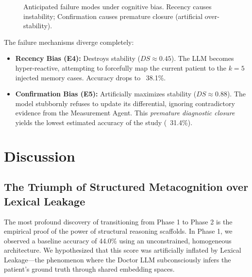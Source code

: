 \documentclass[12pt, a4paper, twoside]{report}
\begin{document}
\begin{figure}[htbp]
\centering
{}
\caption{Anticipated failure modes under cognitive bias. Recency causes instability; Confirmation causes premature closure (artificial over-stability).}
\label{fig:bias_impact_phase2}
\end{figure}

The failure mechanisms diverge completely:
\begin{itemize}
    \item \textbf{Recency Bias (E4):} Destroys stability ($DS \approx 0.45$). The LLM becomes hyper-reactive, attempting to forcefully map the current patient to the $k=5$ injected memory cases. Accuracy drops to ~38.1\%.
    \item \textbf{Confirmation Bias (E5):} Artificially maximizes stability ($DS \approx 0.88$). The model stubbornly refuses to update its differential, ignoring contradictory evidence from the Measurement Agent. This \textit{premature diagnostic closure} yields the lowest estimated accuracy of the study (~31.4\%).
\end{itemize}

\chapter{Discussion}

\section{The Triumph of Structured Metacognition over Lexical Leakage}
The most profound discovery of transitioning from Phase 1 to Phase 2 is the empirical proof of the power of structural reasoning scaffolds. In Phase 1, we observed a baseline accuracy of 44.0\% using an unconstrained, homogeneous architecture. We hypothesized that this score was artificially inflated by Lexical Leakage—the phenomenon where the Doctor LLM subconsciously infers the patient's ground truth through shared embedding spaces.
\end{document}
